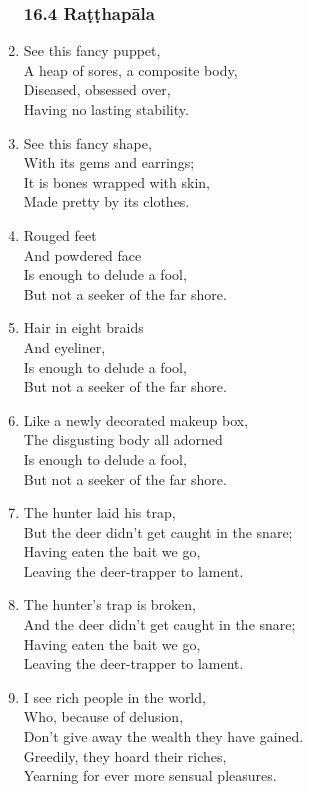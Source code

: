 \documentclass[10pt, openany]{book}
\begin{document}
\begin{enumerate}
\subsubsection*{16.4 Raṭṭhapāla}

\item See this fancy puppet,\\
A heap of sores, a composite body,\\
Diseased, obsessed over,\\
Having no lasting stability.

\item See this fancy shape,\\
With its gems and earrings;\\
It is bones wrapped with skin,\\
Made pretty by its clothes.

\item Rouged feet\\
And powdered face\\
Is enough to delude a fool,\\
But not a seeker of the far shore.

\item Hair in eight braids\\
And eyeliner,\\
Is enough to delude a fool,\\
But not a seeker of the far shore.

\item Like a newly decorated makeup box,\\
The disgusting body all adorned\\
 Is enough to delude a fool,\\
But not a seeker of the far shore.

\item The hunter laid his trap,\\
But the deer didn’t get caught in the snare;\\
Having eaten the bait we go,\\
Leaving the deer-trapper to lament.

\item The hunter’s trap is broken,\\
And the deer didn’t get caught in the snare;\\
Having eaten the bait we go,\\
Leaving the deer-trapper to lament.

\item I see rich people in the world,\\
Who, because of delusion, \\
Don’t give away the wealth they have gained.\\
Greedily, they hoard their riches,\\
Yearning for ever more sensual pleasures.


\end{enumerate}
\end{document}
